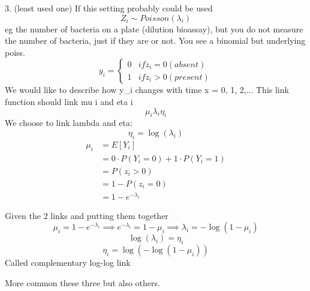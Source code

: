 3. (least used one) If this setting probably could be used
$$Z_i \sim Poisson(\lambda_i)$$ eg the number of bacteria on a plate (dilution bioassay), but you do not measure the number of bacteria, just if they are or not.
You see a binomial but underlying poiss.
$$
y_i = 
\begin{cases}
  0 & if z_i = 0 (absent) \\
  1 & if z_i > 0 (present)
\end{cases}
$$
We would like to describe how y_i changes with time x = 0, 1, 2,... 
This link function should link mu i and eta i 
$$\mu_i \lambda_i \eta_i$$
We choose to link lambda and eta:
$$\eta_i = \log(\lambda_i)$$
\begin{align*}
  \mu_i 
  &= E[Y_i] \\
  &= 0 \cdot P(Y_i = 0) + 1 \cdot P(Y_i = 1) \\
  &= P(z_i > 0) \\ 
  &= 1 - P(z_i = 0) \\
  &= 1 - e^{-\lambda_i}
\end{align*}

Given the 2 links and putting them together 
$$\mu_i = 1 - e^{-\lambda_i} \implies e^{-\lambda_i} = 1 - \mu_i \implies \lambda_i = -\log(1 - \mu_i)$$
$$\log(\lambda_i) = \eta_i$$
$$\eta_i = \log(-\log(1-\mu_i))$$
Called complementary log-log link

More common these three but also others.